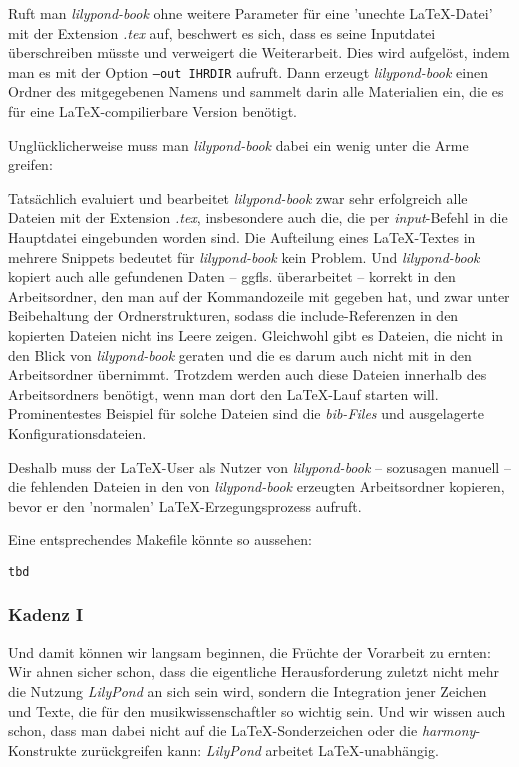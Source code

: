 Ruft man \emph{lilypond-book} ohne weitere Parameter für eine 'unechte
\LaTeX-Datei' mit der Extension \emph{.tex} auf, beschwert es sich, dass es
seine Inputdatei überschreiben müsste und verweigert die Weiterarbeit. Dies wird
aufgelöst, indem man es mit der Option \texttt{--out IHRDIR} aufruft.
Dann erzeugt \emph{lilypond-book} einen Ordner des mitgegebenen Namens und
sammelt darin alle Materialien ein, die es für eine \LaTeX-compilierbare Version
benötigt.

Unglücklicherweise muss man \emph{lilypond-book} dabei ein wenig unter die Arme
greifen:

Tatsächlich evaluiert und bearbeitet \emph{lilypond-book} zwar sehr erfolgreich
alle Dateien mit der Extension \emph{.tex}, insbesondere auch die, die per
\emph{input}-Befehl in die Hauptdatei eingebunden worden sind. Die Aufteilung
eines LaTeX-Textes in mehrere Snippets bedeutet für \emph{lilypond-book} kein
Problem. Und \emph{lilypond-book} kopiert auch alle gefundenen Daten -- ggfls.
überarbeitet -- korrekt in den Arbeitsordner, den man auf der Kommandozeile mit
gegeben hat, und zwar unter Beibehaltung der Ordnerstrukturen, sodass die
include-Referenzen in den kopierten Dateien nicht ins Leere zeigen. Gleichwohl
gibt es Dateien, die nicht in den Blick von \emph{lilypond-book} geraten und die
es darum auch nicht mit in den Arbeitsordner übernimmt. Trotzdem werden auch
diese Dateien innerhalb des Arbeitsordners benötigt, wenn man dort den
\LaTeX-Lauf starten will. Prominentestes Beispiel für solche Dateien sind die
\emph{bib-Files} und ausgelagerte Konfigurationsdateien.

Deshalb muss der \LaTeX-User als Nutzer von \emph{lilypond-book} -- sozusagen
manuell -- die fehlenden Dateien in den von \emph{lilypond-book} erzeugten
Arbeitsordner kopieren, bevor er den 'normalen' \LaTeX-Erzegungsprozess aufruft.

Eine entsprechendes Makefile könnte so aussehen:

\begin{verbatim}
tbd
\end{verbatim}


\subsubsection{Kadenz I}

Und damit können wir langsam beginnen, die Früchte der Vorarbeit zu ernten: Wir
ahnen sicher schon, dass die eigentliche Herausforderung zuletzt nicht mehr die
Nutzung \emph{LilyPond} an sich sein wird, sondern die Integration jener Zeichen
und Texte, die für den musikwissenschaftler so wichtig sein. Und wir wissen auch
schon, dass man dabei nicht auf die \LaTeX-Sonderzeichen oder die
\emph{harmony}-Konstrukte zurückgreifen kann: \emph{LilyPond} arbeitet
\LaTeX-unabhängig.

